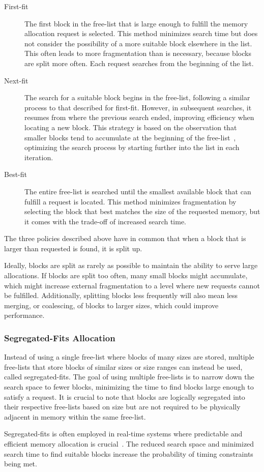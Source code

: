 \begin{description}
    \item[First-fit]
        The first block in the free-list that is large enough to fulfill the memory allocation request is selected. This method minimizes search time but does not consider the possibility of a more suitable block elsewhere in the list. This often leads to more fragmentation than is necessary, because blocks are split more often. Each request searches from the beginning of the list.
    \item[Next-fit]
        The search for a suitable block begins in the free-list, following a similar process to that described for first-fit. However, in subsequent searches, it resumes from where the previous search ended, improving efficiency when locating a new block. This strategy is based on the observation that smaller blocks tend to accumulate at the beginning of the free-list~\cite{gchandbook}, optimizing the search process by starting further into the list in each iteration.
    \item[Best-fit]
        The entire free-list is searched until the smallest available block that can fulfill a request is located. This method minimizes fragmentation by selecting the block that best matches the size of the requested memory, but it comes with the trade-off of increased search time.
\end{description}

The three policies described above have in common that when a block that is larger than requested is found, it is split up. 

Ideally, blocks are split as rarely as possible to maintain the ability to serve large allocations. If blocks are split too often, many small blocks might accumulate, which might increase external fragmentation to a level where new requests cannot be fulfilled. Additionally, splitting blocks less frequently will also mean less merging, or coalescing, of blocks to larger sizes, which could improve performance.

\subsubsection{Segregated-Fits Allocation}

Instead of using a single free-list where blocks of many sizes are stored, multiple free-lists that store blocks of similar sizes or size ranges can instead be used, called segregated-fits. The goal of using multiple free-lists is to narrow down the search space to fewer blocks, minimizing the time to find blocks large enough to satisfy a request. It is crucial to note that blocks are logically segregated into their respective free-lists based on size but are not required to be physically adjacent in memory within the same free-list. 

Segregated-fits is often employed in real-time systems where predictable and efficient memory allocation is crucial~\cite{gchandbook, TLSF}. The reduced search space and minimized search time to find suitable blocks increase the probability of timing constraints being met.

